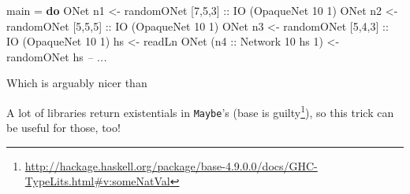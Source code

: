 \documentclass[]{article}
\newenvironment{Shaded}{\begin{snugshade}}{\end{snugshade}}
\newcommand{\CommentTok}[1]{\textcolor[rgb]{0.56,0.35,0.01}{\textit{#1}}}
\newcommand{\DataTypeTok}[1]{\textcolor[rgb]{0.13,0.29,0.53}{#1}}
\newcommand{\DecValTok}[1]{\textcolor[rgb]{0.00,0.00,0.81}{#1}}
\newcommand{\FunctionTok}[1]{\textcolor[rgb]{0.00,0.00,0.00}{#1}}
\newcommand{\KeywordTok}[1]{\textcolor[rgb]{0.13,0.29,0.53}{\textbf{#1}}}
\newcommand{\NormalTok}[1]{#1}
\newcommand{\OtherTok}[1]{\textcolor[rgb]{0.56,0.35,0.01}{#1}}
\renewcommand{\href}[2]{#2\footnote{\url{#1}}}
\begin{document}
\begin{itemize}
\begin{Shaded}
\begin{Highlighting}[]
\NormalTok{main }\FunctionTok{=} \KeywordTok{do}
    \DataTypeTok{ONet}\NormalTok{ n1 }\OtherTok{<-}\NormalTok{ randomONet [}\DecValTok{7}\NormalTok{,}\DecValTok{5}\NormalTok{,}\DecValTok{3}\NormalTok{]}\OtherTok{ ::} \DataTypeTok{IO}\NormalTok{ (}\DataTypeTok{OpaqueNet} \DecValTok{10} \DecValTok{1}\NormalTok{)}
    \DataTypeTok{ONet}\NormalTok{ n2 }\OtherTok{<-}\NormalTok{ randomONet [}\DecValTok{5}\NormalTok{,}\DecValTok{5}\NormalTok{,}\DecValTok{5}\NormalTok{]}\OtherTok{ ::} \DataTypeTok{IO}\NormalTok{ (}\DataTypeTok{OpaqueNet} \DecValTok{10} \DecValTok{1}\NormalTok{)}
    \DataTypeTok{ONet}\NormalTok{ n3 }\OtherTok{<-}\NormalTok{ randomONet [}\DecValTok{5}\NormalTok{,}\DecValTok{4}\NormalTok{,}\DecValTok{3}\NormalTok{]}\OtherTok{ ::} \DataTypeTok{IO}\NormalTok{ (}\DataTypeTok{OpaqueNet} \DecValTok{10} \DecValTok{1}\NormalTok{)}
\NormalTok{    hs }\OtherTok{<-}\NormalTok{ readLn}
    \DataTypeTok{ONet}\NormalTok{ (}\OtherTok{n4 ::} \DataTypeTok{Network} \DecValTok{10}\NormalTok{ hs }\DecValTok{1}\NormalTok{) }\OtherTok{<-}\NormalTok{ randomONet hs}
    \CommentTok{-- ...}
\end{Highlighting}
\end{Shaded}

  Which is arguably nicer than

\begin{Shaded}
\end{Shaded}

  A lot of libraries return existentials in \texttt{Maybe}'s
  (\href{http://hackage.haskell.org/package/base-4.9.0.0/docs/GHC-TypeLits.html\#v:someNatVal}{base
  is guilty}), so this trick can be useful for those, too!


\end{itemize}
\end{document}
